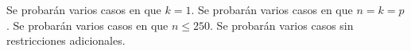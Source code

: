\documentclass{oci}
\begin{document}
\begin{scoreDescription}
  	Se probarán varios casos en que $k = 1$.
 	Se probarán varios casos en que $n = k = p$.
  	Se probarán varios casos en que $n \leq 250$.
	Se probarán varios casos sin restricciones adicionales.
\end{scoreDescription}

\begin{sampleDescription}
\end{sampleDescription}
\end{document}
